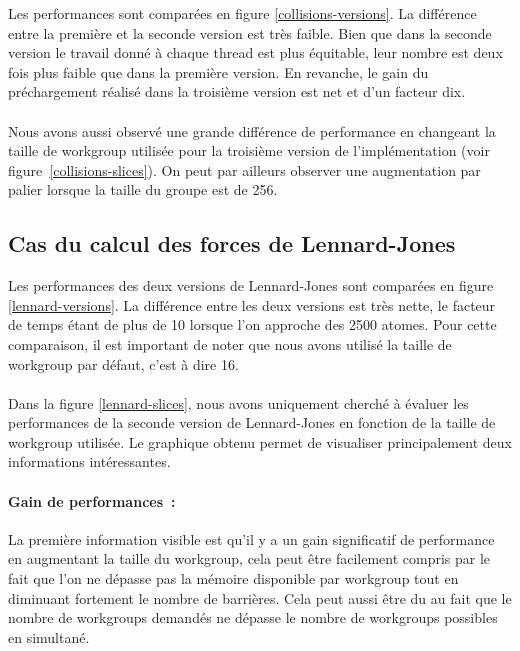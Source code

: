 \documentclass{article}
\begin{document}
Les performances sont comparées en figure \ref{collisions-versions}. La différence entre la première et la seconde version est très faible. Bien
que dans la seconde version le travail donné à chaque thread est plus
équitable, leur nombre est deux fois plus faible que dans la première version.
En revanche, le gain du préchargement réalisé dans la troisième version est
net et d'un facteur dix.
\paragraph{}
Nous avons aussi observé une grande différence de performance en
changeant la taille de workgroup utilisée pour la troisième version
de l'implémentation (voir figure~\ref{collisions-slices}). On peut par
ailleurs observer une augmentation par palier lorsque la taille du groupe est
de 256.

\subsection{Cas du calcul des forces de Lennard-Jones}

Les performances des deux versions de Lennard-Jones sont comparées en figure
\ref{lennard-versions}. La différence entre les deux versions est très nette,
le facteur de temps étant de plus de 10 lorsque l'on approche des 2500 atomes.
Pour cette comparaison, il est important de noter que nous avons utilisé la
taille de workgroup par défaut, c'est à dire 16.
\paragraph{}
Dans la figure \ref{lennard-slices}, nous avons uniquement cherché à évaluer les
performances de la seconde version de Lennard-Jones en fonction de la taille de
workgroup utilisée. Le graphique obtenu permet de visualiser principalement deux
informations intéressantes.
\paragraph{Gain de performances~:}
La première information visible est qu'il y a un gain significatif de
performance en augmentant la taille du workgroup, cela peut être facilement
compris par le fait que l'on ne dépasse pas la mémoire disponible par workgroup
tout en diminuant fortement le nombre de barrières. Cela peut aussi être du au
fait que le nombre de workgroups demandés ne dépasse le nombre de workgroups
possibles en simultané.
\end{document}
